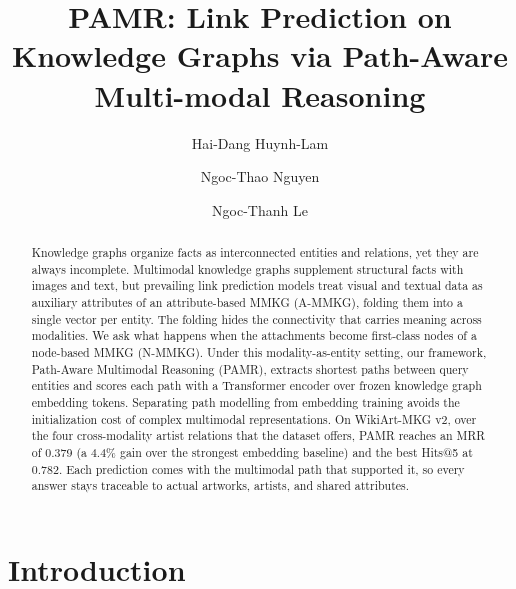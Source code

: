 \documentclass[runningheads]{llncs}
\begin{document}
%
\title{PAMR: Link Prediction on Knowledge Graphs via Path-Aware Multi-modal Reasoning}
%

\author{Hai-Dang Huynh-Lam \and
  Ngoc-Thao Nguyen \and
Ngoc-Thanh Le}
%
%
\maketitle  %
%
\begin{abstract}
  Knowledge graphs organize facts as interconnected entities and relations, yet
  they are always incomplete. Multimodal knowledge graphs supplement structural
  facts with images and text, but prevailing link prediction models treat visual
  and textual data as auxiliary attributes of an attribute-based MMKG (A-MMKG),
  folding them into a single vector per entity. The folding hides the
  connectivity that carries meaning across modalities. We ask what happens when
  the attachments become first-class nodes of a node-based MMKG (N-MMKG). Under
  this modality-as-entity setting, our framework, Path-Aware Multimodal
  Reasoning (PAMR), extracts shortest paths between query entities and scores
  each path with a Transformer encoder over frozen knowledge graph embedding
  tokens. Separating path modelling from embedding training avoids the
  initialization cost of complex multimodal representations. On WikiArt-MKG v2,
  over the four cross-modality artist relations that the dataset offers, PAMR
  reaches an MRR of 0.379 (a 4.4\% gain over the strongest embedding baseline)
  and the best Hits@5 at 0.782. Each prediction comes with the multimodal path
  that supported it, so every answer stays traceable to actual artworks,
  artists, and shared attributes.

\end{abstract}
%
%
%

\section{Introduction}
\label{sec:introduction}
\end{document}
